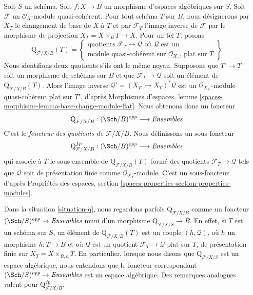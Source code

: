 \begin{situation}
\label{situation-q}
Soit $S$ un schéma. Soit $f : X \to B$ un morphisme d'espaces algébriques sur
$S$. Soit $\mathcal{F}$ un $\mathcal{O}_X$-module quasi-cohérent. Pour tout
schéma $T$ sur $B$, nous désignerons par $X_T$ le changement de base de $X$ à
$T$ et par $\mathcal{F}_T$ l'image inverse de $\mathcal{F}$ par le morphisme
de projection $X_T = X \times_B T \to X$. Pour un tel $T$, posons
$$
\text{Q}_{\mathcal{F}/X/B}(T) =
\left\{
\begin{matrix}
\text{quotients }\mathcal{F}_T \to \mathcal{Q}\text{ où }
\mathcal{Q}\text{ est un}\\
\text{module quasi-cohérent sur }
\mathcal{O}_{X_T}\text{, plat sur }T
\end{matrix}
\right\}
$$
Nous identifions deux quotients s'ils ont le même noyau. Supposons que
$T' \to T$ soit un morphisme de schémas sur $B$ et que
$\mathcal{F}_T \to \mathcal{Q}$ soit un élément de
$\text{Q}_{\mathcal{F}/X/B}(T)$. Alors l'image inverse
$\mathcal{Q}' = (X_{T'} \to X_T)^*\mathcal{Q}$ est un
$\mathcal{O}_{X_{T'}}$-module quasi-cohérent plat sur $T'$, d'après Morphismes
d'espaces, lemme \ref{spaces-morphisms-lemma-base-change-module-flat}. Nous
obtenons donc un foncteur
\begin{equation}
\label{equation-q}
\text{Q}_{\mathcal{F}/X/B} : (\Sch/B)^{opp} \longrightarrow \textit{Ensembles}
\end{equation}
C'est le {\it foncteur des quotients de $\mathcal{F}/X/B$}. Nous définissons
un sous-foncteur
\begin{equation}
\label{equation-q-fp}
\text{Q}^{fp}_{\mathcal{F}/X/B} : (\Sch/B)^{opp} \longrightarrow \textit{Ensembles}
\end{equation}
qui associe à $T$ le sous-ensemble de $\text{Q}_{\mathcal{F}/X/B}(T)$ formé
des quotients $\mathcal{F}_T \to \mathcal{Q}$ tels que $\mathcal{Q}$ soit de
présentation finie comme $\mathcal{O}_{X_T}$-module. C'est un sous-foncteur
d'après Propriétés des espaces, section
\ref{spaces-properties-section-properties-modules}.
\end{situation}

\noindent
Dans la situation \ref{situation-q}, nous regardons parfois
$\text{Q}_{\mathcal{F}/X/B}$ comme un foncteur
$(\Sch/S)^{opp} \to \textit{Ensembles}$ muni d'un morphisme
$\text{Q}_{\mathcal{F}/X/S} \to B$. En effet, si $T$ est un schéma sur $S$,
un élément de $\text{Q}_{\mathcal{F}/X/B}(T)$ est un couple
$(h, \mathcal{Q})$, où $h$ un morphisme $h : T \to B$ et où $\mathcal{Q}$
est un quotient $\mathcal{F}_T \to \mathcal{Q}$ plat sur $T$, de présentation
finie sur $X_T = X \times_{B, h} T$. En particulier, lorsque nous disons que
$\text{Q}_{\mathcal{F}/X/S}$ est un espace algébrique, nous entendons que le
foncteur correspondant $(\Sch/S)^{opp} \to \textit{Ensembles}$ est un espace
algébrique. Des remarques analogues valent pour
$\text{Q}^{fp}_{\mathcal{F}/X/B}$.

